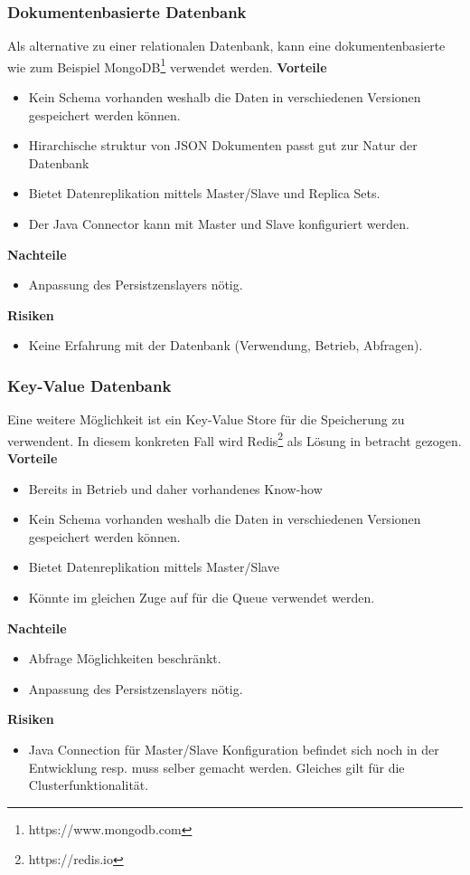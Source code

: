 \subsubsection{Dokumentenbasierte Datenbank}

Als alternative zu einer relationalen Datenbank, kann eine dokumentenbasierte wie zum Beispiel MongoDB\footnote{https://www.mongodb.com} verwendet werden. 
\newline
\newline
\textbf{Vorteile}
\begin{itemize}
	\item Kein Schema vorhanden weshalb die Daten in verschiedenen Versionen gespeichert werden können.
	\item Hirarchische struktur von JSON Dokumenten passt gut zur Natur der Datenbank
	\item Bietet Datenreplikation mittels Master/Slave und Replica Sets.
	\item Der Java Connector kann mit Master und Slave konfiguriert werden.
\end{itemize}
\textbf{Nachteile}
\begin{itemize}
	\item Anpassung des Persistzenslayers nötig.
\end{itemize}
\textbf{Risiken}
\begin{itemize}
	\item Keine Erfahrung mit der Datenbank (Verwendung, Betrieb, Abfragen).
\end{itemize}

\subsubsection{Key-Value Datenbank}

Eine weitere Möglichkeit ist ein Key-Value Store für die Speicherung zu verwendent. In diesem konkreten Fall wird Redis\footnote{https://redis.io} als Lösung in betracht gezogen. \newline
\newline
\textbf{Vorteile}
\begin{itemize}
	\item Bereits in Betrieb und daher vorhandenes Know-how
	\item Kein Schema vorhanden weshalb die Daten in verschiedenen Versionen gespeichert werden können.
	\item Bietet Datenreplikation mittels Master/Slave
	\item Könnte im gleichen Zuge auf für die Queue verwendet werden.	
\end{itemize}
\textbf{Nachteile}
\begin{itemize}
	\item Abfrage Möglichkeiten beschränkt.
	\item Anpassung des Persistzenslayers nötig.
\end{itemize}
\textbf{Risiken}
\begin{itemize}
	\item Java Connection für Master/Slave Konfiguration befindet sich noch in der Entwicklung resp. muss selber gemacht werden. Gleiches gilt für die Clusterfunktionalität.
\end{itemize}

